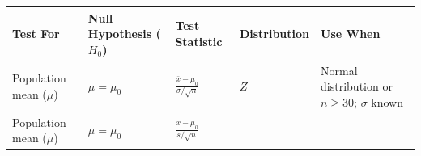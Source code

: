 \documentclass[]{book}
\begin{document}
\newpage
\begin{landscape}

\begin{longtable}[]{@{}lllll@{}}
\toprule
\begin{minipage}[b]{0.19\columnwidth}\raggedright
Test For\strut
\end{minipage} & \begin{minipage}[b]{0.16\columnwidth}\raggedright
Null Hypothesis (\(H_0\))\strut
\end{minipage} & \begin{minipage}[b]{0.19\columnwidth}\raggedright
Test Statistic\strut
\end{minipage} & \begin{minipage}[b]{0.16\columnwidth}\raggedright
Distribution\strut
\end{minipage} & \begin{minipage}[b]{0.16\columnwidth}\raggedright
Use When\strut
\end{minipage}\tabularnewline
\midrule
\endhead
\begin{minipage}[t]{0.19\columnwidth}\raggedright
Population mean (\(\mu\))\strut
\end{minipage} & \begin{minipage}[t]{0.16\columnwidth}\raggedright
\(\mu = \mu_0\)\strut
\end{minipage} & \begin{minipage}[t]{0.19\columnwidth}\raggedright
\(\frac{\bar{x} -\mu_{0}}{\sigma/\sqrt{n}}\)\strut
\end{minipage} & \begin{minipage}[t]{0.16\columnwidth}\raggedright
\(Z\)\strut
\end{minipage} & \begin{minipage}[t]{0.16\columnwidth}\raggedright
Normal distribution or \(n\geq 30\); \(\sigma\) known\strut
\end{minipage}\tabularnewline
\begin{minipage}[t]{0.19\columnwidth}\raggedright
Population mean (\(\mu\))\strut
\end{minipage} & \begin{minipage}[t]{0.16\columnwidth}\raggedright
\(\mu = \mu_0\)\strut
\end{minipage} & \begin{minipage}[t]{0.19\columnwidth}\raggedright
\(\frac{\bar{x} -\mu_{0}}{s/\sqrt{n}}\)\strut
\end{minipage} & \begin{minipage}[t]{0.16\columnwidth}\raggedright

\end{minipage}
\end{longtable}
\end{landscape}
\end{document}
